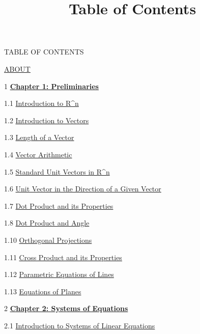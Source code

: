 \documentclass{ximera}
\title{Table of Contents} \license{CC BY-NC-SA 4.0}
\begin{document}
\begin{abstract}
\end{abstract}
\maketitle

	TABLE OF CONTENTS
	
	\href{https://ximera.osu.edu/oerlinalg/LinearAlgebra/ABOUT/main}{ABOUT}
	
1	\href{https://ximera.osu.edu/oerlinalg/LinearAlgebra/XLAChapter_prelim/main}{\textbf{Chapter 1: Preliminaries}}
	
1.1	\href{https://ximera.osu.edu/oerlinalg/LinearAlgebra/RRN-0010/main}{Introduction to R^n}
	
1.2	\href{https://ximera.osu.edu/oerlinalg/LinearAlgebra/VEC-0010/main}{Introduction to Vectors}
	
1.3	\href{https://ximera.osu.edu/oerlinalg/LinearAlgebra/VEC-0020/main}{Length of a Vector}
	
1.4	\href{https://ximera.osu.edu/oerlinalg/LinearAlgebra/VEC-0030/main}{Vector Arithmetic}
	
1.5	\href{https://ximera.osu.edu/oerlinalg/LinearAlgebra/VEC-0035/main}{Standard Unit Vectors in R^n}
	
1.6	\href{https://ximera.osu.edu/oerlinalg/LinearAlgebra/VEC-0036/main}{Unit Vector in the Direction of a Given Vector}
	
1.7	\href{https://ximera.osu.edu/oerlinalg/LinearAlgebra/VEC-0050/main}{Dot Product and its Properties}
	
1.8	\href{https://ximera.osu.edu/oerlinalg/LinearAlgebra/VEC-0060/main}{Dot Product and Angle }
	
1.10	\href{https://ximera.osu.edu/oerlinalg/LinearAlgebra/VEC-0070/main}{Orthogonal Projections}
	
1.11	\href{https://ximera.osu.edu/oerlinalg/LinearAlgebra/VEC-0080/main}{Cross Product and its Properties}
	
1.12	\href{https://ximera.osu.edu/oerlinalg/LinearAlgebra/RRN-0020/main}{Parametric Equations of Lines}
	
1.13	\href{https://ximera.osu.edu/oerlinalg/LinearAlgebra/RRN-0030/main}{Equations of Planes}
	
2	\href{https://ximera.osu.edu/oerlinalg/LinearAlgebra/XLAChapter_systems/main}{\textbf{Chapter 2: Systems of Equations}}
	
2.1	\href{https://ximera.osu.edu/oerlinalg/LinearAlgebra/SYS-0020/main}{Introduction to Systems of Linear Equations}
	
\end{document}
